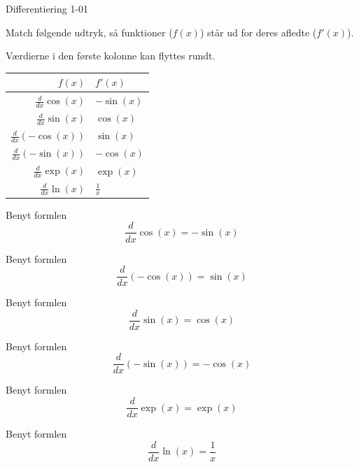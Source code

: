 \documentclass{article}
\newenvironment{sortingwidget}[2]{\begin{tabular}{|r|l|}
\hline #1 & #2 \\ \hline}{\hline
\end{tabular}}
\begin{document}
\tableofcontents
\newpage


\begin{exercise}{Differentiering 1-01}

Match følgende udtryk, så funktioner ($f(x)$) står
ud for deres afledte ($f'(x)$).

Værdierne i den første kolonne kan flyttes rundt.


\begin{sortingwidget}{$f(x)$}{$f'(x)$}
$\frac{d}{dx} \cos(x)$ & $ - \sin(x)$\\
$\frac{d}{dx} \sin(x)$ & $\cos(x)$ \\
$\frac{d}{dx} \left(- \cos(x) \right)$ & $\sin(x)$ \\
$\frac{d}{dx} \left(- \sin(x) \right)$ & $ - \cos(x)$ \\
$\frac{d}{dx} \exp(x)$ & $\exp(x)$ \\
$\frac{d}{dx} \ln(x)$ & $\frac{1}{x}$ \\
\end{sortingwidget}


\hint
Benyt formlen
\[
\frac{d}{dx} \cos(x) = - \sin(x)
\]


\hint
Benyt formlen
\[
\frac{d}{dx} \left(- \cos(x) \right) = \sin(x)
\]


\hint
Benyt formlen
\[
\frac{d}{dx} \sin(x) = \cos(x)
\]


\hint
Benyt formlen
\[
\frac{d}{dx} \left( - \sin(x) \right) = -\cos(x)
\]


\hint
Benyt formlen
\[
\frac{d}{dx} \exp(x) = \exp(x)
\]

\hint
Benyt formlen
\[
\frac{d}{dx} \ln(x) = \frac{1}{x}
\]



\end{exercise}
\end{document}
